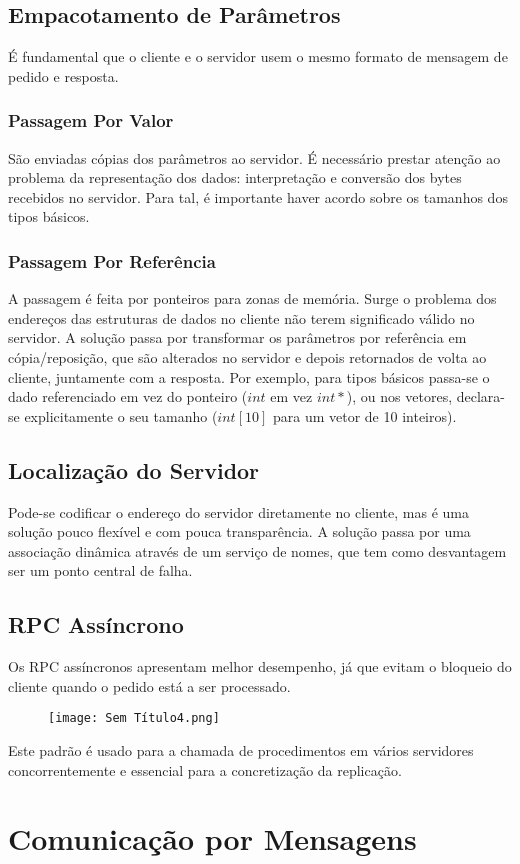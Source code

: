 \documentclass[10pt,a4paper]{report}
\begin{document}
\subsection{Empacotamento de Parâmetros}
É fundamental que o cliente e o servidor usem o mesmo formato de mensagem de pedido e resposta.
\subsubsection{Passagem Por Valor}
São enviadas cópias dos parâmetros ao servidor. É necessário prestar atenção ao problema da representação dos dados: interpretação e conversão dos bytes recebidos no servidor. Para tal, é importante haver acordo sobre os tamanhos dos tipos básicos.
\subsubsection{Passagem Por Referência}
A passagem é feita por ponteiros para zonas de memória. Surge o problema dos endereços das estruturas de dados no cliente não terem significado válido no servidor. A solução passa por transformar os parâmetros por referência em cópia/reposição, que são alterados no servidor e depois retornados de volta ao cliente, juntamente com a resposta. Por exemplo, para tipos básicos passa-se o dado referenciado em vez do ponteiro ($int$ em vez $int*$), ou nos vetores, declara-se explicitamente o seu tamanho ($int[10]$ para um vetor de 10 inteiros).
\subsection{Localização do Servidor}
Pode-se codificar o endereço do servidor diretamente no cliente, mas é uma solução pouco flexível e com pouca transparência. A solução passa por uma associação dinâmica através de um serviço de nomes, que tem como desvantagem ser um ponto central de falha.
\subsection{RPC Assíncrono}
Os RPC assíncronos apresentam melhor desempenho, já que evitam o bloqueio do cliente quando o pedido está a ser processado.
\begin{figure}[H]
\centering
\texttt{[image: Sem Título4.png]}
\end{figure}
Este padrão é usado para a chamada de procedimentos em vários servidores concorrentemente e essencial para a concretização da replicação.
\section{Comunicação por Mensagens}
\end{document}

